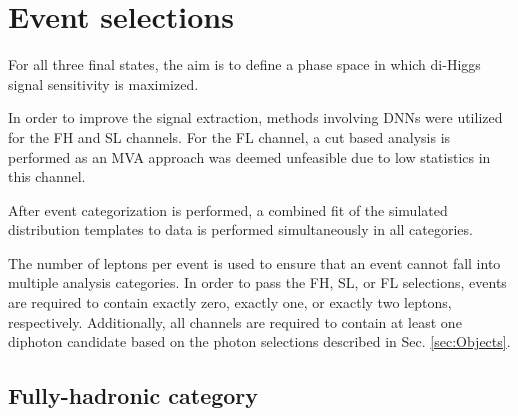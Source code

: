 \section{Event selections} \label{sec:event_selection}

For all three final states, the aim is to define a phase space in which di-Higgs signal sensitivity is maximized. 

In order to improve the signal extraction, methods involving DNNs were utilized for the
FH and SL channels. For the FL channel, a cut based analysis is performed as an MVA approach was deemed unfeasible 
due to low statistics in this channel. 

After event categorization is performed, a combined fit of the simulated \mgg distribution templates to data is performed simultaneously in all categories.

The number of leptons per event is used to ensure that an event cannot fall into multiple analysis categories. 
In order to pass the FH, SL, or FL selections, events are required to contain exactly zero, exactly one, or exactly two leptons, respectively. 
Additionally, all channels are required to contain at least one diphoton candidate based on the photon selections described in Sec. \ref{sec:Objects}.  

\subsection{Fully-hadronic category}




% 


